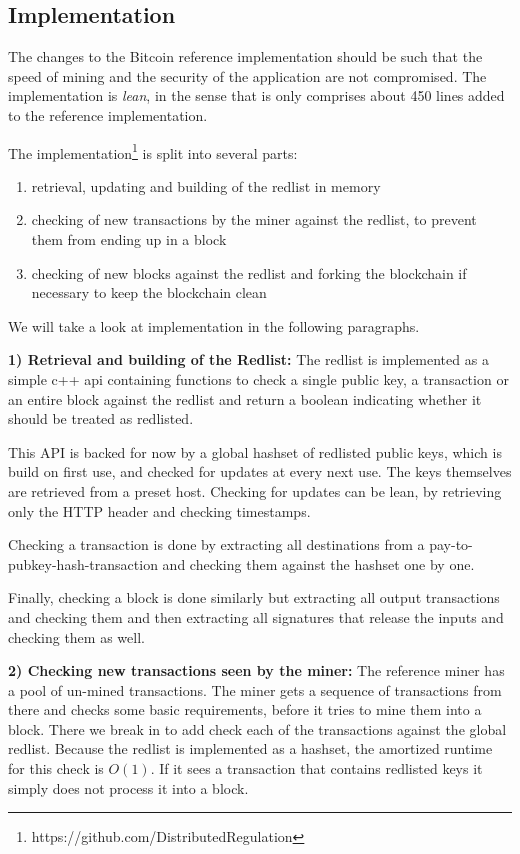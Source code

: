 \documentclass[12pt,journal,compsoc]{IEEEtran}
\begin{document}
\subsection{Implementation}
The changes to the Bitcoin reference implementation should be such that the speed of mining and the
security of the application are not compromised.
The implementation is \emph{lean}, in the sense that is only comprises about 450 lines added to the
reference implementation.

The implementation\footnote{https://github.com/DistributedRegulation} is split into several parts:

\begin{enumerate}
  \item retrieval, updating and building of the redlist in memory
  \item checking of new transactions by the miner against the redlist, to prevent them from ending
    up in a block
  \item checking of new blocks against the redlist and forking the blockchain if necessary to keep
    the blockchain clean
\end{enumerate}

We will take a look at implementation in the following paragraphs.

  \textbf{1) Retrieval and building of the Redlist:}
    The redlist is implemented as a simple c++ api containing functions to check a single public
    key, a transaction or an entire block against the redlist and return a boolean indicating
    whether it should be treated as redlisted.

    This API is backed for now by a global hashset of redlisted public keys, which is build on first
    use, and checked for updates at every next use.
    The keys themselves are retrieved from a preset host.
    Checking for updates can be lean, by retrieving only the HTTP header and checking timestamps.

    Checking a transaction is done by extracting all destinations from a
    pay-to-pubkey-hash-transaction and checking them against the hashset one by one.

    Finally, checking a block is done similarly but extracting all output transactions and checking
    them and then extracting all signatures that release the inputs and checking them as well.

  \textbf{2) Checking new transactions seen by the miner:}
    The reference miner has a pool of un-mined transactions.
    The miner gets a sequence of transactions from there and checks some basic requirements, before
    it tries to mine them into a block.
    There we break in to add check each of the transactions against the global redlist.
    Because the redlist is implemented as a hashset, the amortized runtime for this check is $O(1)$.
    If it sees a transaction that contains redlisted keys it simply does not process it into a
    block.
\end{document}

